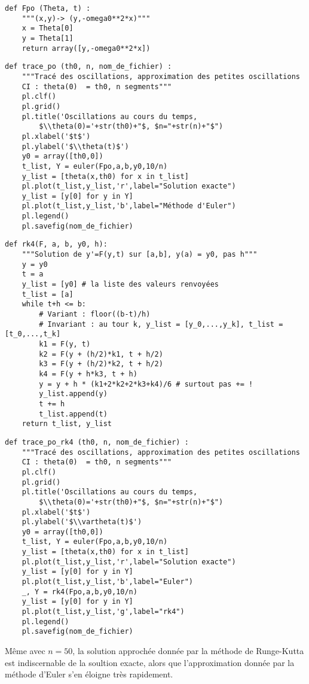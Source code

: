 \question{}
\begin{lstlisting}
def Fpo (Theta, t) :
    """(x,y)-> (y,-omega0**2*x)"""
    x = Theta[0]
    y = Theta[1]
    return array([y,-omega0**2*x])
\end{lstlisting}


\question{}
\begin{lstlisting}
def trace_po (th0, n, nom_de_fichier) :
    """Tracé des oscillations, approximation des petites oscillations
    CI : theta(0)  = th0, n segments"""
    pl.clf()
    pl.grid()
    pl.title('Oscillations au cours du temps, 
        $\\theta(0)='+str(th0)+"$, $n="+str(n)+"$")
    pl.xlabel('$t$')
    pl.ylabel('$\\theta(t)$')
    y0 = array([th0,0])
    t_list, Y = euler(Fpo,a,b,y0,10/n)
    y_list = [theta(x,th0) for x in t_list]
    pl.plot(t_list,y_list,'r',label="Solution exacte")
    y_list = [y[0] for y in Y]
    pl.plot(t_list,y_list,'b',label="Méthode d'Euler")
    pl.legend()
    pl.savefig(nom_de_fichier)   
\end{lstlisting}

\question{}
\begin{lstlisting}
def rk4(F, a, b, y0, h):
    """Solution de y'=F(y,t) sur [a,b], y(a) = y0, pas h"""
    y = y0
    t = a
    y_list = [y0] # la liste des valeurs renvoyées
    t_list = [a]
    while t+h <= b:
        # Variant : floor((b-t)/h)
        # Invariant : au tour k, y_list = [y_0,...,y_k], t_list = [t_0,...,t_k]
        k1 = F(y, t)
        k2 = F(y + (h/2)*k1, t + h/2)
        k3 = F(y + (h/2)*k2, t + h/2)
        k4 = F(y + h*k3, t + h)
        y = y + h * (k1+2*k2+2*k3+k4)/6 # surtout pas += !
        y_list.append(y)
        t += h
        t_list.append(t)
    return t_list, y_list
\end{lstlisting}

\question{}
\begin{lstlisting}
def trace_po_rk4 (th0, n, nom_de_fichier) :
    """Tracé des oscillations, approximation des petites oscillations
    CI : theta(0)  = th0, n segments"""
    pl.clf()
    pl.grid()
    pl.title('Oscillations au cours du temps, 
        $\\theta(0)='+str(th0)+"$, $n="+str(n)+"$")
    pl.xlabel('$t$')
    pl.ylabel('$\\vartheta(t)$')
    y0 = array([th0,0])
    t_list, Y = euler(Fpo,a,b,y0,10/n)
    y_list = [theta(x,th0) for x in t_list]
    pl.plot(t_list,y_list,'r',label="Solution exacte")
    y_list = [y[0] for y in Y]
    pl.plot(t_list,y_list,'b',label="Euler")
    _, Y = rk4(Fpo,a,b,y0,10/n)
    y_list = [y[0] for y in Y]
    pl.plot(t_list,y_list,'g',label="rk4")
    pl.legend()
    pl.savefig(nom_de_fichier)
\end{lstlisting}
Même avec $n=50$, la solution approchée donnée par la méthode de Runge-Kutta est indiscernable de la soultion exacte, alors que l'approximation donnée par la méthode d'Euler s'en éloigne très rapidement. 

